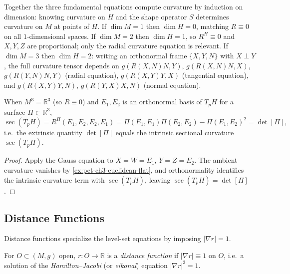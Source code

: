 \begin{remark}
  \label{rem:pet-ch3-curvature-equations-by-dimension}
  \leanok
  Together the three fundamental equations compute curvature by induction on
  dimension: knowing curvature on $H$ and the shape operator $S$ determines
  curvature on $M$ at points of $H$. If $\dim M=1$ then $\dim H=0$, matching
  $R\equiv0$ on all $1$-dimensional spaces. If $\dim M=2$ then $\dim H=1$, so
  $R^H\equiv0$ and $X,Y,Z$ are proportional; only the radial curvature equation
  is relevant. If $\dim M=3$ then $\dim H=2$: writing an orthonormal frame
  $\{X,Y,N\}$ with $X\perp Y$, the full curvature tensor depends on
  $g(R(X,N)N,Y)$, $g(R(X,N)N,X)$, $g(R(Y,N)N,Y)$ (radial equation),
  $g(R(X,Y)Y,X)$ (tangential equation), and $g(R(X,Y)Y,N)$, $g(R(Y,X)X,N)$
  (normal equation).
\end{remark}

\begin{corollary}
  \label{cor:pet-ch3-gauss-egregium}
  \leanok
  When $M^3=\mathbb R^3$ (so $R\equiv0$) and $E_1,E_2$ is an orthonormal basis of
  $T_pH$ for a surface $H\subset\mathbb R^3$,
  \[
    \sec(T_pH)=R^H(E_1,E_2,E_2,E_1)=\Pi(E_1,E_1)\Pi(E_2,E_2)-\Pi(E_1,E_2)^2=\det[\Pi],
  \]
  i.e.\ the extrinsic quantity $\det[\Pi]$ equals the intrinsic sectional
  curvature $\sec(T_pH)$.
\end{corollary}
\begin{proof}
  \sketch
  Apply the Gauss equation to $X=W=E_1$, $Y=Z=E_2$. The ambient curvature
  vanishes by \cref{ex:pet-ch3-euclidean-flat}, and orthonormality identifies the intrinsic curvature term with
  $\sec(T_pH)$, leaving $\sec(T_pH)=\det[\Pi]$.
\end{proof}

\subsection{Distance Functions}

Distance functions specialize the level-set equations by imposing
$|\nabla r|=1$.

\begin{definition}
  \label{def:pet-ch3-distance-function}
  \leanok
  For $O\subset(M,g)$ open, $r:O\to\mathbb R$ is a \emph{distance function} if
  $|\nabla r|\equiv1$ on $O$, i.e.\ a solution of the \emph{Hamilton--Jacobi} (or
  \emph{eikonal}) equation $|\nabla r|^2=1$.
\end{definition}

